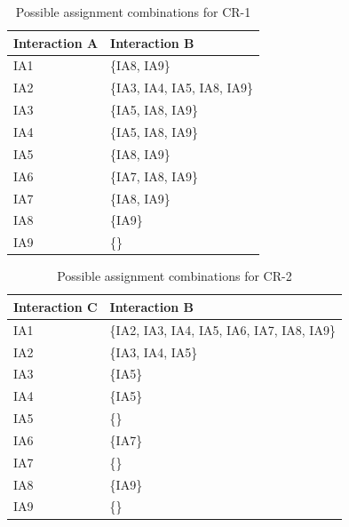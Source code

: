 \begin{table}[H]
\centering
\begin{tabular}{ll}
\multicolumn{1}{l|}{Interaction A}    & Interaction B                \\ \hline
\multicolumn{1}{l|}{IA1}  & \{IA8, IA9\}                      \\
\multicolumn{1}{l|}{IA2}  & \{IA3, IA4, IA5, IA8, IA9\}                           \\
\multicolumn{1}{l|}{IA3}  & \{IA5, IA8, IA9\} \\
\multicolumn{1}{l|}{IA4}  & \{IA5, IA8, IA9\}          \\
\multicolumn{1}{l|}{IA5}  & \{IA8, IA9\}                \\
\multicolumn{1}{l|}{IA6}  & \{IA7, IA8, IA9\}                 						\\
\multicolumn{1}{l|}{IA7}  & \{IA8, IA9\}                \\
\multicolumn{1}{l|}{IA8}  & \{IA9\}                     \\
\multicolumn{1}{l|}{IA9}  & \{\}               \\ \hline
\end{tabular}
\caption{Possible assignment combinations for CR-1}
\label{tbl:crAssignment1}
\end{table}

\begin{table}[H]
\centering
\begin{tabular}{ll}
\multicolumn{1}{l|}{Interaction C}    & Interaction B                \\ \hline
\multicolumn{1}{l|}{IA1}  & \{IA2, IA3, IA4, IA5, IA6, IA7, IA8, IA9\}                      \\
\multicolumn{1}{l|}{IA2}  & \{IA3, IA4, IA5\}                           \\
\multicolumn{1}{l|}{IA3}  & \{IA5\} \\
\multicolumn{1}{l|}{IA4}  & \{IA5\}          \\
\multicolumn{1}{l|}{IA5}  & \{\}                \\
\multicolumn{1}{l|}{IA6}  & \{IA7\}                     \\
\multicolumn{1}{l|}{IA7}  & \{\}                \\
\multicolumn{1}{l|}{IA8}  & \{IA9\}                     \\
\multicolumn{1}{l|}{IA9}  & \{\}               \\ \hline
\end{tabular}
\caption{Possible assignment combinations for CR-2}
\label{tbl:crAssignment2}
\end{table}


